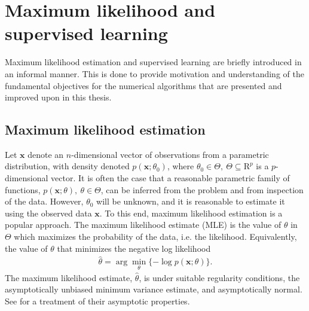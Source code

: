 \chapter{Maximum likelihood and supervised learning}

Maximum likelihood estimation and supervised learning are briefly introduced in an informal manner. %
This is done to provide motivation and understanding of the fundamental objectives for the numerical algorithms that are presented and improved upon in this thesis.


\section{Maximum likelihood estimation}

Let $\mathbf{x}$ denote an $n$-dimensional vector of observations from a parametric distribution, with density denoted $p(\mathbf{x};\theta_0)$, where $\theta_0\in \Theta,~\Theta\subseteq \mathrm{R}^p$ is a $p$-dimensional vector.
It is often the case that a reasonable parametric family of functions, $p(\mathbf{x};\theta),~\theta\in \Theta$, can be inferred from the problem and from inspection of the data.
However, $\theta_0$ will be unknown, and it is reasonable to estimate it using the observed data $\mathbf{x}$.
To this end, maximum likelihood estimation is a popular approach.
The maximum likelihood estimate (MLE) is the value of $\theta$ in $\Theta$ which maximizes the probability of the data, i.e. the likelihood.
Equivalently, the value of $\theta$ that minimizes the negative log likelihood
\begin{align}\label{eq:mle}
	\hat{\theta} = \arg\min_\theta \{-\log p(\mathbf{x};\theta)\}.
\end{align}
The maximum likelihood estimate, $\hat{\theta}$, is under suitable regularity conditions, the asymptotically unbiased minimum variance estimate, and asymptotically normal.
See \citet{vanDerVaart} for a treatment of their asymptotic properties.



